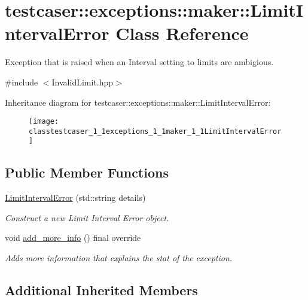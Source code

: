 \hypertarget{classtestcaser_1_1exceptions_1_1maker_1_1LimitIntervalError}{}\section{testcaser\+::exceptions\+::maker\+::Limit\+Interval\+Error Class Reference}
\label{classtestcaser_1_1exceptions_1_1maker_1_1LimitIntervalError}


Exception that is raised when an Interval setting to limits are ambigious.  




{\ttfamily \#include $<$Invalid\+Limit.\+hpp$>$}

Inheritance diagram for testcaser\+::exceptions\+::maker\+::Limit\+Interval\+Error\+:\begin{figure}[H]
\begin{center}
\leavevmode
\texttt{[image: classtestcaser\_1\_1exceptions\_1\_1maker\_1\_1LimitIntervalError]}
\end{center}
\end{figure}
\subsection*{Public Member Functions}
\begin{DoxyCompactItemize}
\item 
\mbox{\hyperlink{classtestcaser_1_1exceptions_1_1maker_1_1LimitIntervalError_aa25b5fb862cea4c6946ee334cb7590eb}{Limit\+Interval\+Error}} (std\+::string details)
\begin{DoxyCompactList}\small\item\em Construct a new Limit Interval Error object. \end{DoxyCompactList}\item 
void \mbox{\hyperlink{classtestcaser_1_1exceptions_1_1maker_1_1LimitIntervalError_a6a050ee23517e8dcb6477011b4a5e406}{add\+\_\+more\+\_\+info}} () final override
\begin{DoxyCompactList}\small\item\em Adds more information that explains the stat of the exception. \end{DoxyCompactList}\end{DoxyCompactItemize}
\subsection*{Additional Inherited Members}


